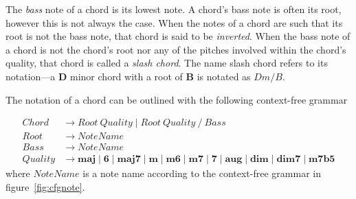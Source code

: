 The \textit{bass} note of a chord is its lowest note. A chord's bass note is often its root, however this is not always the case. When the notes of a chord are such that its root is not the bass note, that chord is said to be \textit{inverted}. When the bass note of a chord is not the chord's root nor any of the pitches involved within the chord's quality, that chord is called a \textit{slash chord}. The name slash chord refers to its notation---a \textbf{D} minor chord with a root of \textbf{B} is notated as $Dm/B$.

The notation of a chord can be outlined with the following context-free grammar

\begin{align*}
Chord &\to Root\ Quality \mid Root\ Quality\ \texttt{/} \ Bass \\
Root &\to NoteName \\
Bass &\to NoteName \\
Quality &\to \textbf{maj} \mid \textbf{6} \mid \textbf{maj7} \mid \textbf{m} \mid \textbf{m6} \mid \textbf{m7} \mid \textbf{7} \mid \textbf{aug} \mid \textbf{dim} \mid \textbf{dim7} \mid \textbf{m7b5}
\end{align*}
where $NoteName$ is a note name according to the context-free grammar in figure~\ref{fig:cfgnote}.